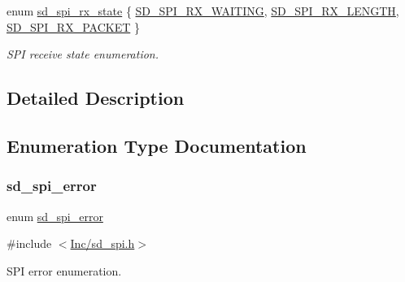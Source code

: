\begin{DoxyCompactItemize}
enum \mbox{\hyperlink{group___s_d___s_p_i___types_ga0cf86b44c1bee9173f49395d05e076d5}{sd\+\_\+spi\+\_\+rx\+\_\+state}} \{ \mbox{\hyperlink{group___s_d___s_p_i___types_gga0cf86b44c1bee9173f49395d05e076d5a18932b80de20adc5422578c1512c5f6d}{S\+D\+\_\+\+S\+P\+I\+\_\+\+R\+X\+\_\+\+W\+A\+I\+T\+I\+NG}}, 
\mbox{\hyperlink{group___s_d___s_p_i___types_gga0cf86b44c1bee9173f49395d05e076d5a3d56ab099b151c3b01757f4a1c8bfc0f}{S\+D\+\_\+\+S\+P\+I\+\_\+\+R\+X\+\_\+\+L\+E\+N\+G\+TH}}, 
\mbox{\hyperlink{group___s_d___s_p_i___types_gga0cf86b44c1bee9173f49395d05e076d5aad68b7ce311a7ca2b9a5546e8c6767fd}{S\+D\+\_\+\+S\+P\+I\+\_\+\+R\+X\+\_\+\+P\+A\+C\+K\+ET}}
 \}
\begin{DoxyCompactList}\small\item\em S\+PI receive state enumeration. \end{DoxyCompactList}\end{DoxyCompactItemize}


\subsection{Detailed Description}


\subsection{Enumeration Type Documentation}
\mbox{\label{group___s_d___s_p_i___types_ga9ae67f7089a8196e9c6b74b8a6708c2e}} 
\subsubsection{\texorpdfstring{sd\+\_\+spi\+\_\+error}{sd\_spi\_error}}
{\footnotesize\ttfamily enum \mbox{\hyperlink{group___s_d___s_p_i___types_ga9ae67f7089a8196e9c6b74b8a6708c2e}{sd\+\_\+spi\+\_\+error}}}



{\ttfamily \#include $<$\mbox{\hyperlink{sd__spi_8h}{Inc/sd\+\_\+spi.\+h}}$>$}



S\+PI error enumeration. 

